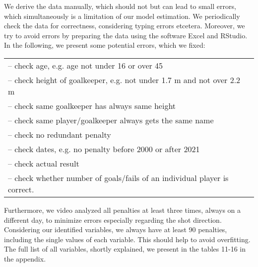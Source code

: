 \documentclass[12pt,dvipsnames]{article}%
\begin{document}
We derive the data manually, which should not but can lead to small errors, which simultaneously is a limitation of our model estimation. We periodically check the data for correctness, considering typing errors etcetera. Moreover, we try to avoid errors by preparing the data using the software Excel and RStudio. In the following, we present some potential errors, which we fixed: 

\begin{tabular}[t]{lr} 
-- check age, e.g. age not under 16 or over 45 \\ 
-- check height of goalkeeper, e.g. not under 1.7 m and not over 2.2 m \\ 
-- check same goalkeeper has always same height  \\
-- check same player/goalkeeper always gets the same name \\
-- check no redundant penalty \\
-- check dates, e.g. no penalty before 2000 or after 2021 \\
-- check actual result \\
-- check whether number of goals/fails of an individual player is correct. \\
\end{tabular}

\vspace{+0.5cm}
Furthermore, we video analyzed all penalties at least three times, always on a different day, to minimize errors especially regarding the shot direction.  \\
Considering our identified variables, we always have at least 90 penalties, including the single values of each variable. This should help to avoid overfitting.  The full list of all variables, shortly explained, we present in the tables 11-16 in the appendix. \\
\end{document}
